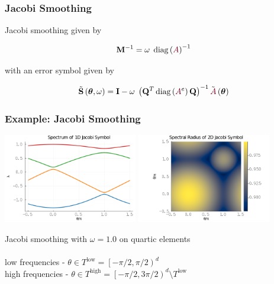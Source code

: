 \documentclass{beamer}
\DeclareMathOperator{\diag}{diag}
\begin{document}

\begin{frame}
\begin{center}
\frametitle{Jacobi Smoothing}

Jacobi smoothing given by

\begin{equation}
\mathbf{M}^{-1} = \omega \hspace{1mm} \diag \left( {\color{burgundy}A} \right)^{-1}
\end{equation}

with an error symbol given by

\begin{equation}
\tilde{\mathbf{S}} \left( \boldsymbol{\theta}, \omega \right) = \mathbf{I} - \omega \hspace{1mm} \left( \mathbf{Q}^T \diag \left( {\color{burgundy}A}^e \right) \mathbf{Q} \right)^{-1} \tilde{{\color{burgundy}A}} \left( \boldsymbol{\theta} \right)
\end{equation}

\end{center}
\end{frame}


\begin{frame}
\begin{center}
\frametitle{Example: Jacobi Smoothing}

\includegraphics[height=3.9cm]{../img/JacobiSymbol1D}
\includegraphics[height=3.9cm]{../img/JacobiSymbol2D}

Jacobi smoothing with $\omega = 1.0$ on quartic elements\\

~\\

low frequencies - $\theta \in T^{\text{low}} = \left[ - \pi / 2, \pi / 2 \right)^d$\\

high frequencies - $\theta \in T^{\text{high}} = \left[ - \pi / 2, 3 \pi / 2 \right)^d \setminus T^{\text{low}}$

\end{center}
\end{frame}
\end{document}
